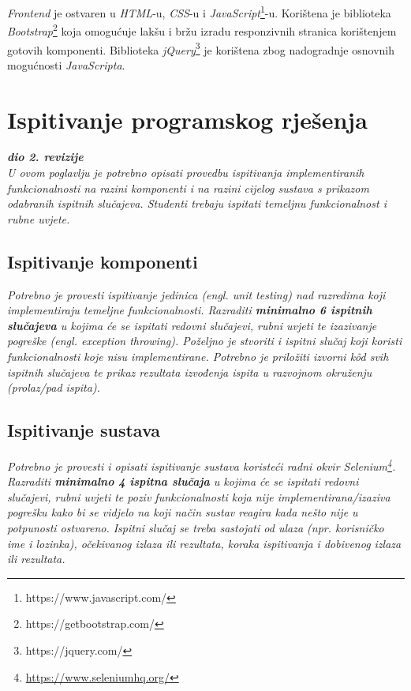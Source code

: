 		\textit{Frontend} je ostvaren u \textit{HTML}-u, \textit{CSS}-u i \textit{JavaScript}\footnote{https://www.javascript.com/}-u. Korištena je biblioteka \textit{Bootstrap}\footnote{https://getbootstrap.com/} koja omogućuje lakšu i bržu izradu responzivnih stranica korištenjem gotovih komponenti. Biblioteka \textit{jQuery}\footnote{https://jquery.com/} je korištena zbog nadogradnje osnovnih mogućnosti \textit{JavaScripta}.
			
			\eject 
		
	
		\section{Ispitivanje programskog rješenja}
			
			\textbf{\textit{dio 2. revizije}}\\
			
			 \textit{U ovom poglavlju je potrebno opisati provedbu ispitivanja implementiranih funkcionalnosti na razini komponenti i na razini cijelog sustava s prikazom odabranih ispitnih slučajeva. Studenti trebaju ispitati temeljnu funkcionalnost i rubne uvjete.}
	
			
			\subsection{Ispitivanje komponenti}
			\textit{Potrebno je provesti ispitivanje jedinica (engl. unit testing) nad razredima koji implementiraju temeljne funkcionalnosti. Razraditi \textbf{minimalno 6 ispitnih slučajeva} u kojima će se ispitati redovni slučajevi, rubni uvjeti te izazivanje pogreške (engl. exception throwing). Poželjno je stvoriti i ispitni slučaj koji koristi funkcionalnosti koje nisu implementirane. Potrebno je priložiti izvorni kôd svih ispitnih slučajeva te prikaz rezultata izvođenja ispita u razvojnom okruženju (prolaz/pad ispita). }
			
			
			
			\subsection{Ispitivanje sustava}
			
			 \textit{Potrebno je provesti i opisati ispitivanje sustava koristeći radni okvir Selenium\footnote{\url{https://www.seleniumhq.org/}}. Razraditi \textbf{minimalno 4 ispitna slučaja} u kojima će se ispitati redovni slučajevi, rubni uvjeti te poziv funkcionalnosti koja nije implementirana/izaziva pogrešku kako bi se vidjelo na koji način sustav reagira kada nešto nije u potpunosti ostvareno. Ispitni slučaj se treba sastojati od ulaza (npr. korisničko ime i lozinka), očekivanog izlaza ili rezultata, koraka ispitivanja i dobivenog izlaza ili rezultata.\\ }
			 
